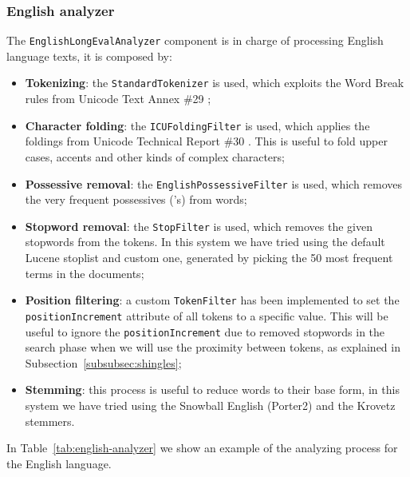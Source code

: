 \subsubsection{English analyzer}

The \texttt{EnglishLongEvalAnalyzer} component is in charge of processing English language texts, it is composed by:
\begin{itemize}
    \item \textbf{Tokenizing}: the \texttt{StandardTokenizer} is used, which exploits the Word Break rules from Unicode Text Annex \#29 \citep{UAX29};
    \item \textbf{Character folding}: the \texttt{ICUFoldingFilter} is used, which applies the foldings from Unicode Technical Report \#30 \citep{UTR30}. This is useful to fold upper cases, accents and other kinds of complex characters;
    \item \textbf{Possessive removal}: the \texttt{EnglishPossessiveFilter} is used, which removes the very frequent possessives ('s) from words;
    \item \textbf{Stopword removal}: the \texttt{StopFilter} is used, which removes the given stopwords from the tokens. In this system we have tried using the default Lucene \citep{Lucene} stoplist and custom one, generated by picking the 50 most frequent terms in the documents;
    \item \textbf{Position filtering}: a custom \texttt{TokenFilter} has been implemented to set the \texttt{positionIncrement} attribute of all tokens to a specific value. This will be useful to ignore the \texttt{positionIncrement} due to removed stopwords in the search phase when we will use the proximity between tokens, as explained in Subsection~\ref{subsubsec:shingles};
    \item \textbf{Stemming}: this process is useful to reduce words to their base form, in this system we have tried using the Snowball English (Porter2) \citep{EnSnowball} and the Krovetz \citep{Krovetz2000} stemmers.
\end{itemize}

In Table~\ref{tab:english-analyzer} we show an example of the analyzing process for the English language.

